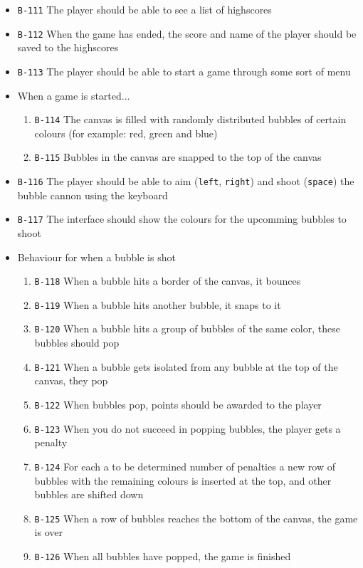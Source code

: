 \documentclass[a4paper]{article}
\begin{document}
\begin{itemize}
  \item \texttt{B-111} The player should be able to see a list of highscores
  \item \texttt{B-112} When the game has ended, the score and name of the player should be saved to the highscores
  \item \texttt{B-113} The player should be able to start a game through some sort of menu

  \item When a game is started...
  \begin{enumerate}
    \item \texttt{B-114} The canvas is filled with randomly distributed bubbles of certain colours (for example: red, green and blue)
    \item \texttt{B-115} Bubbles in the canvas are snapped to the top of the canvas
  \end{enumerate}
  
  \item \texttt{B-116} The player should be able to aim (\texttt{left}, \texttt{right}) and shoot (\texttt{space}) the bubble cannon using the keyboard
  \item \texttt{B-117} The interface should show the colours for the upcomming bubbles to shoot
  \item Behaviour for when a bubble is shot
  \begin{enumerate}
    \item \texttt{B-118} When a bubble hits a border of the canvas, it bounces
    \item \texttt{B-119} When a bubble hits another bubble, it snaps to it
    \item \texttt{B-120} When a bubble hits a group of bubbles of the same color, these bubbles should pop
    \item \texttt{B-121} When a bubble gets isolated from any bubble at the top of the canvas, they pop
    \item \texttt{B-122} When bubbles pop, points should be awarded to the player
    \item \texttt{B-123} When you do not succeed in popping bubbles, the player gets a penalty
    \item \texttt{B-124} For each a to be determined number of penalties a new row of bubbles with the remaining colours is inserted at the top, and other bubbles are shifted down
    \item \texttt{B-125} When a row of bubbles reaches the bottom of the canvas, the game is over
    \item \texttt{B-126} When all bubbles have popped, the game is finished
  \end{enumerate}
  

\end{itemize}
\end{document}
